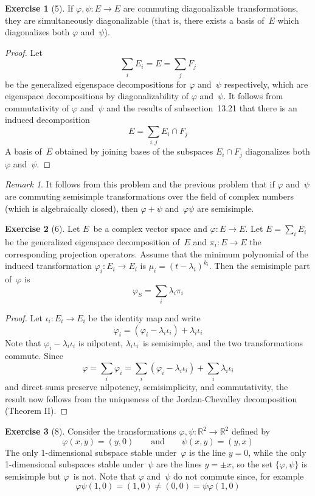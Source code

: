\documentclass[letterpaper,12pt]{article}
\newcommand{\R}{\mathbb{R}}
\newcommand{\sect}{\cap}
\theoremstyle{definition}
\newtheorem*{exer}{Exercise}
\theoremstyle{remark}
\newtheorem*{rmk}{Remark}
\begin{document}
\begin{exer}[5]
If \(\varphi,\psi:E\to E\) are commuting diagonalizable transformations, they are simultaneously diagonalizable (that is, there exists a basis of~\(E\) which diagonalizes both \(\varphi\) and~\(\psi\)).
\end{exer}
\begin{proof}
Let
\[\sum_i E_i=E=\sum_j F_j\]
be the generalized eigenspace decompositions for \(\varphi\) and~\(\psi\) respectively, which are eigenspace decompositions by diagonalizability of \(\varphi\) and~\(\psi\). It follows from commutativity of \(\varphi\) and~\(\psi\) and the results of subsection~13.21 that there is an induced decomposition
\[E=\sum_{i,j}E_i\sect F_j\]
A basis of~\(E\) obtained by joining bases of the subspaces \(E_i\sect F_j\) diagonalizes both \(\varphi\) and~\(\psi\).
\end{proof}

\begin{rmk}
It follows from this problem and the previous problem that if \(\varphi\) and~\(\psi\) are commuting semisimple transformations over the field of complex numbers (which is algebraically closed), then \(\varphi+\psi\) and~\(\varphi\psi\) are semisimple.
\end{rmk}

\begin{exer}[6]
Let \(E\)~be a complex vector space and \(\varphi:E\to E\). Let \(E=\sum_i E_i\) be the generalized eigenspace decomposition of~\(E\) and \(\pi_i:E\to E\) the corresponding projection operators. Assume that the minimum polynomial of the induced transformation \(\varphi_i:E_i\to E_i\) is \(\mu_i=(t-\lambda_i)^{k_i}\). Then the semisimple part of~\(\varphi\) is
\[\varphi_S=\sum_i\lambda_i\pi_i\]
\end{exer}
\begin{proof}
Let \(\iota_i:E_i\to E_i\) be the identity map and write
\[\varphi_i=(\varphi_i-\lambda_i\iota_i)+\lambda_i\iota_i\]
Note that \(\varphi_i-\lambda_i\iota_i\) is nilpotent, \(\lambda_i\iota_i\)~is semisimple, and the two transformations commute. Since
\[\varphi=\sum_i\varphi_i=\sum_i(\varphi_i-\lambda_i\iota_i)+\sum_i\lambda_i\iota_i\]
and direct sums preserve nilpotency, semisimplicity, and commutativity, the result now follows from the uniqueness of the Jordan-Chevalley decomposition (Theorem II).
\end{proof}

\begin{exer}[8] Consider the transformations \(\varphi,\psi:\R^2\to\R^2\) defined by
\[\varphi(x,y)=(y,0)\qquad\text{and}\qquad\psi(x,y)=(y,x)\]
The only 1-dimensional subspace stable under~\(\varphi\) is the line \(y=0\), while the only 1-dimensional subspaces stable under~\(\psi\) are the lines \(y=\pm x\), so the set \(\{\varphi,\psi\}\) is semisimple but \(\varphi\)~is not. Note that \(\varphi\) and~\(\psi\) do not commute since, for example
\[\varphi\psi(1,0)=(1,0)\ne(0,0)=\psi\varphi(1,0)\]
\end{exer}
\end{document}
